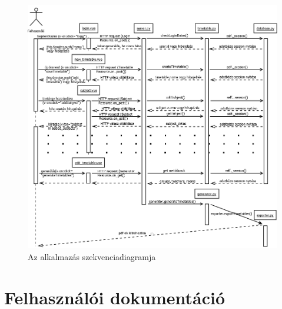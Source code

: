 \begin{figure}
\includegraphics[width=\linewidth]{images/szekvencia.png}
\caption{Az alkalmazás szekvenciadiagramja}
\end{figure}

\section{Felhasználói dokumentáció}

